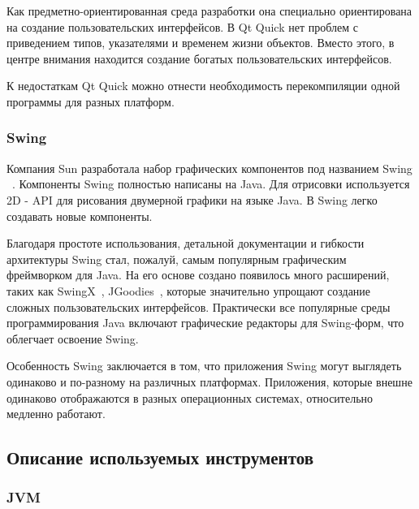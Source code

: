 \documentclass[14pt]{extarticle}
\begin{document}
Как предметно-ориентированная среда разработки она специально ориентирована на создание пользовательских интерфейсов. В Qt Quick нет проблем с приведением типов, указателями и временем жизни объектов. Вместо этого, в центре внимания находится создание богатых пользовательских интерфейсов.

К недостаткам Qt Quick можно отнести необходимость перекомпиляции одной программы для разных платформ. 
		 		
		
		\subsubsection*{Swing}
				
				Компания Sun разработала набор графических компонентов под названием Swing ~\cite{swing}. Компоненты Swing полностью написаны на Java. Для отрисовки используется 2D - API для рисования двумерной графики на языке Java. В Swing легко создавать новые компоненты.

Благодаря простоте использования, детальной документации и гибкости архитектуры Swing стал, пожалуй, самым популярным графическим фреймворком для Java. На его основе создано появилось много расширений, таких как SwingX~\cite{swingx}, JGoodies~\cite{jgoodies}, которые значительно упрощают создание сложных пользовательских интерфейсов. Практически все популярные среды программирования Java включают графические редакторы для Swing-форм, что облегчает освоение Swing.
		
Особенность Swing заключается в том, что приложения Swing могут выглядеть одинаково и по-разному на различных платформах. Приложения, которые внешне одинаково отображаются в разных операционных системах, относительно медленно работают. 
		
	
		
		 
	\subsection{Описание используемых инструментов }
		
		\subsubsection*{JVM}
	
\end{document}
